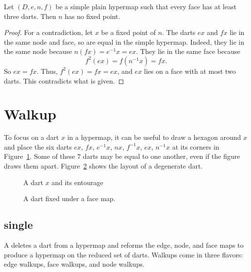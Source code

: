 \begin{lemma} 
Let $(D,e,n,f)$ be a simple plain hypermap such that every face has
at least three darts.
Then $n$ has no fixed point.
%
\end{lemma}

\begin{proof} For a contradiction, let $x$ be a fixed point of
$n$. The darts $e x$ and $f x$ lie in the same node and face, so are
equal in the simple hypermap.  Indeed, they lie in the same node
because $n(f x) = e^{-1} x = e x$. They lie in the same face because
\begin{displaymath}f^2 (e x) = f(n^{-1} x) = f x.\end{displaymath}
So $e x = f x$.  Thus, $f^2 (e x) = f x = e x$, and $e x$ lies on a
face with at most two darts.  This contradicts what is given.
\end{proof}




\section{Walkup}

To focus on a dart $x$ in a
hypermap, it can be useful to draw a hexagon around $x$ and place
the six darts $e x$,
$f x$, $e^{-1} x$, $n x$,  $f^{-1} x$, $e x$, $n^{-1} x$  at its corners
in Figure~\ref{fig:dart+}.  Some of these $7$ darts may be
equal to one another, even if the figure draws them apart.
Figure~\ref{fig:dart-fix} shows the layout of a degenerate dart.
%

\begin{figure}[htb]
\centering
{}
\caption{A dart $x$ and its entourage}
\label{fig:dart+}
\end{figure}

\begin{figure}[htb]
\centering
{}
\caption{A dart fixed under a face map.}
\label{fig:dart-fix}
\end{figure}

\subsection{single}

A  deletes
a dart from a hypermap and reforms the edge, node, and face
maps to produce a hypermap on the reduced set of darts.  Walkups
come in three flavors: edge walkups, face walkups,
and node walkups.

